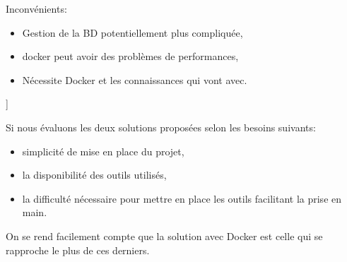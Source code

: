 \documentclass[
    iai, %
    il, %
]{heig-tb}
\begin{document}
\begin{multicols}{2}
        Inconvénients:
        \begin{itemize}
            \item Gestion de la BD potentiellement plus compliquée,
            \item \Gls{docker} peut avoir des problèmes de performances, \cite{labrecque}
            \item Nécessite Docker et les connaissances qui vont avec. \cite{labrecque}
        \end{itemize}
    ]
    \blindtext\blindtext
\end{multicols}

Si nous évaluons les deux solutions proposées selon les besoins suivants:
\begin{itemize}
    \item simplicité de mise en place du projet,
    \item la disponibilité des outils utilisés,
    \item la difficulté nécessaire pour mettre en place les outils facilitant la prise en main.
\end{itemize}

On se rend facilement compte que la solution avec Docker est celle qui se rapproche le plus de ces derniers.
\end{document}

